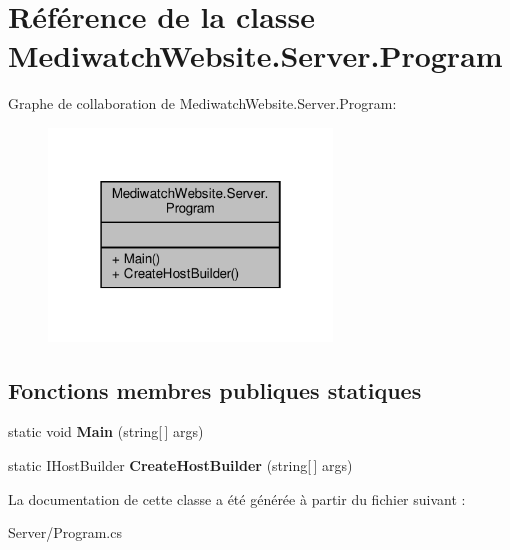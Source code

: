 \hypertarget{class_mediwatch_website_1_1_server_1_1_program}{}\section{Référence de la classe Mediwatch\+Website.\+Server.\+Program}
\label{class_mediwatch_website_1_1_server_1_1_program}


Graphe de collaboration de Mediwatch\+Website.\+Server.\+Program\+:\nopagebreak
\begin{figure}[H]
\begin{center}
\leavevmode
\includegraphics[width=214pt]{class_mediwatch_website_1_1_server_1_1_program__coll__graph}
\end{center}
\end{figure}
\subsection*{Fonctions membres publiques statiques}
\begin{DoxyCompactItemize}
\item 
\mbox{\label{class_mediwatch_website_1_1_server_1_1_program_aefcfeb926a88108a29b0f089d7a9f38e}} 
static void {\bfseries Main} (string\mbox{[}$\,$\mbox{]} args)
\item 
\mbox{\label{class_mediwatch_website_1_1_server_1_1_program_abdb5d3ebe00278212ac69d53683e24f1}} 
static I\+Host\+Builder {\bfseries Create\+Host\+Builder} (string\mbox{[}$\,$\mbox{]} args)
\end{DoxyCompactItemize}


La documentation de cette classe a été générée à partir du fichier suivant \+:\begin{DoxyCompactItemize}
\item 
Server/Program.\+cs\end{DoxyCompactItemize}
